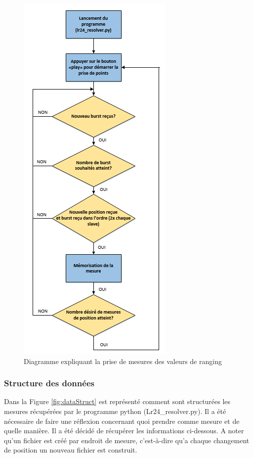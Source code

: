 \begin{figure}[htp]
 \begin{center}
  \includegraphics[scale=0.7]{figures/PriseMesures.png}
  \caption{Diagramme expliquant la prise de mesures des valeurs de ranging}
  \label{fig:mesures} %
 \end{center}
\end{figure}

\subsubsection{Structure des données}

Dans la Figure \ref{fig:dataStruct} est représenté comment sont structurées les mesures récupérées par le programme python (Lr24\_resolver.py). Il a été nécessaire de faire une réflexion concernant quoi prendre comme mesure et de quelle manière. Il a été décidé de récupérer les informations ci-dessous. A noter qu'un fichier est créé par endroit de mesure, c'est-à-dire qu'a chaque changement de position un nouveau fichier est construit.

